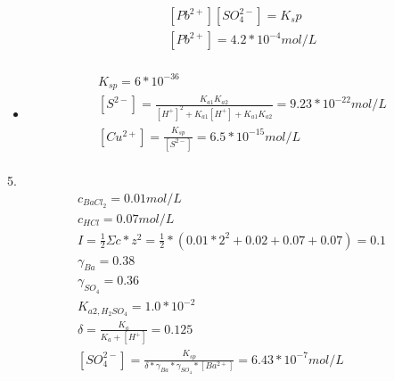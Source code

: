 \documentclass{article}
\begin{document}
\begin{itemize}
\begin{equation}
\begin{multlined}
            [Pb^{2+}][SO_4^{2-}] = K_sp\\
            [Pb^{2+}] = 4.2*10^{-4} mol/L\\
        \end{multlined}
    \end{equation}
    \item
    \begin{equation}
        \begin{multlined}
            K_{sp} = 6*10^{-36}\\
            [S^{2-}] = \frac{K_{a1}K_{a2}}{[H^+]^2+K_{a1}[H^+]+K_{a1}K_{a2}} = 9.23*10^{-22} mol/L\\
            [Cu^{2+}] = \frac{K_{sp}}{[S^{2-}]} = 6.5*10^{-15} mol/L\\
        \end{multlined}
    \end{equation}
\end{itemize}
5.\begin{equation}
    \begin{multlined}
        c_{BaCl_2} = 0.01 mol/L\\
        c_{HCl} = 0.07 mol/L\\
        I = \frac{1}{2}\Sigma c*z^2 = \frac{1}{2}*(0.01*2^2+0.02+0.07+0.07) = 0.1\\
        \gamma_{Ba} = 0.38\\
        \gamma_{SO_4} = 0.36\\
        K_{a2,H_2SO_4} = 1.0*10^{-2}\\
        \delta = \frac{K_a}{K_a+[H^+]} = 0.125\\
        [SO_4^{2-}] = \frac{K_{sp}}{\delta*\gamma_{Ba}*\gamma_{SO_4}*[Ba^{2+}]} = 6.43*10^{-7} mol/L\\
    \end{multlined}
\end{equation}
\end{document}
